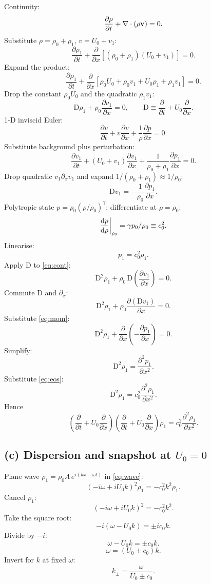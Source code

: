 \documentclass[11pt]{article}
\newcommand{\D}{\mathrm{D}}
\newcommand{\pd}[2]{\frac{\partial #1}{\partial #2}}
\newcommand{\pdd}[2]{\frac{\partial^{2} #1}{\partial #2^{2}}}
\begin{document}
Continuity:
\[ \pd{\rho}{t}+\nabla\cdot(\rho\vb v)=0. \]
Substitute $\rho=\rho_0+\rho_1$, $v=U_0+v_1$:
\[ \pd{\rho_1}{t} + \pd{}{x}[(\rho_0+\rho_1)(U_0+v_1)] = 0. \]
Expand the product:
\[ \pd{\rho_1}{t} + \pd{}{x}[\rho_0 U_0 + \rho_0 v_1 + U_0\rho_1 + \rho_1 v_1] = 0. \]
Drop the constant $\rho_0 U_0$ and the quadratic $\rho_1 v_1$:
\begin{equation}
\D\rho_1 + \rho_0\pd{v_1}{x}=0,\qquad \D\equiv\pd{}{t}+U_0\pd{}{x}.
\label{eq:cont}
\end{equation}
1-D inviscid Euler:
\[ \pd{v}{t} + v\pd{v}{x} + \frac{1}{\rho}\pd{p}{x} = 0. \]
Substitute background plus perturbation:
\[ \pd{v_1}{t} + (U_0+v_1)\pd{v_1}{x} + \frac{1}{\rho_0+\rho_1}\pd{p_1}{x} = 0. \]
Drop quadratic $v_1\partial_x v_1$ and expand $1/(\rho_0+\rho_1)\approx 1/\rho_0$:
\begin{equation}
\D v_1 = -\frac{1}{\rho_0}\pd{p_1}{x}.
\label{eq:mom}
\end{equation}
Polytropic state $p=p_0(\rho/\rho_0)^\gamma$; differentiate at $\rho=\rho_0$:
\[ \dv{p}{\rho}\bigg|_{\rho_0} = \gamma p_0/\rho_0 \equiv c_0^{2}. \]
Linearise:
\begin{equation}
p_1 = c_0^{2}\rho_1.
\label{eq:eos}
\end{equation}
Apply $\D$ to \eqref{eq:cont}:
\[ \D^{2}\rho_1 + \rho_0\,\D\!\left(\pd{v_1}{x}\right) = 0. \]
Commute $\D$ and $\partial_x$:
\[ \D^{2}\rho_1 + \rho_0\pd{(\D v_1)}{x} = 0. \]
Substitute \eqref{eq:mom}:
\[ \D^{2}\rho_1 + \pd{}{x}\!\left(-\pd{p_1}{x}\right) = 0. \]
Simplify:
\[ \D^{2}\rho_1 = \pdd{p_1}{x}. \]
Substitute \eqref{eq:eos}:
\[ \D^{2}\rho_1 = c_0^{2}\pdd{\rho_1}{x}. \]
Hence
\begin{equation}
\boxed{\;\!\!\left(\pd{}{t}+U_0\pd{}{x}\right)\!\!\left(\pd{}{t}+U_0\pd{}{x}\right)\rho_1 = c_0^{2}\pdd{\rho_1}{x}.\;}
\label{eq:wave}
\end{equation}

\subsection*{(c) Dispersion and snapshot at $U_0=0$}

Plane wave $\rho_1=\rho_0 A\,e^{i(kx-\omega t)}$ in \eqref{eq:wave}:
\[ (-i\omega+iU_0 k)^{2}\rho_1 = -c_0^{2}k^{2}\rho_1. \]
Cancel $\rho_1$:
\[ (-i\omega+iU_0 k)^{2} = -c_0^{2}k^{2}. \]
Take the square root:
\[ -i(\omega-U_0 k) = \pm ic_0 k. \]
Divide by $-i$:
\[ \omega-U_0 k = \pm c_0 k. \]
\begin{equation}
\boxed{\;\omega = (U_0\pm c_0)k.\;}
\label{eq:disp}
\end{equation}
Invert for $k$ at fixed $\omega$:
\[ k_\pm = \frac{\omega}{U_0\pm c_0}. \]
\end{document}
